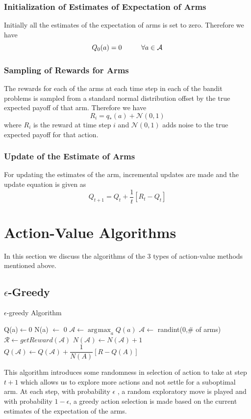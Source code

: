 \documentclass[english]{article}
\DeclareMathOperator*{\argmax}{\arg\!\max}
\begin{document}
\subsubsection{Initialization of Estimates of Expectation of Arms}
Initially all the estimates of the expectation of arms is set to zero. Therefore we have 
$$ Q_{0}(a) = 0 \hspace{10 mm} \forall a \in \mathcal{A} $$ 
\subsubsection{Sampling of Rewards for Arms}
The rewards for each of the arms at each time step in each of the bandit problems is sampled from a standard normal distribution offset by the true expected payoff of that arm. Therefore we have
$$ R_{i} = q_{*}(a) + \mathcal{N}(0,1) $$ where $R_{i}$ is the reward at time step $i$ and $\mathcal{N}(0,1)$ adds noise to the true expected payoff for that action.
\subsubsection{Update of the Estimate of Arms}
For updating the estimates of the arm, incremental updates are made and the update equation is given as
$$ Q_{t+1} = Q_{t} + \dfrac{1}{t}[R_{t} - Q_{t}]$$

\section{Action-Value Algorithms}
In this section we discuss the algorithms of the 3 types of action-value methods mentioned above.
\subsection{$\epsilon$-Greedy}
\begin{algorithm}[H]
\caption{$\epsilon$-greedy Algorithm}
\label{EGAlgorithm}
\begin{algorithmic}[1]
\State Q(a)$\leftarrow$0
\State N(a) $\leftarrow$ 0
\EndFor
\Loop
		\State $\mathcal{A} \leftarrow \argmax_{a} Q(a)$
	\Else 
		\State $\mathcal{A} \leftarrow$ randint(0,\# of arms)
	\EndIf
	\State $\mathcal{R} \leftarrow getReward(\mathcal{A})$
	\State $N(\mathcal{A}) \leftarrow N(\mathcal{A}) + 1$
	\State $Q(\mathcal{A}) \leftarrow Q(\mathcal{A}) + \dfrac{1}{N(A)}[R - Q(A)]$
\EndLoop
\EndProcedure
\end{algorithmic}
\end{algorithm}
This algorithm introduces some randomness in selection of action to take at step $t+1$ which allows us to explore more actions and not settle for a suboptimal arm. At each step, with probability $\epsilon$ , a random exploratory move is played and with probability $1 - \epsilon$, a greedy action selection is made based on the current estimates of the expectation of the arms.
\end{document}
